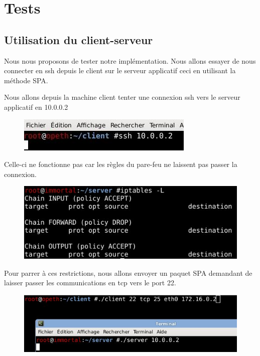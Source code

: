 \chapter{Tests}

\section{Utilisation du client-serveur}

Nous nous proposons de tester notre implémentation. Nous allons essayer de nous connecter en ssh depuis le client sur le serveur applicatif ceci en utilisant la méthode SPA.

Nous allons depuis la machine client tenter une connexion ssh vers le serveur applicatif en 10.0.0.2

\begin{figure}[h]

\centerline{\includegraphics[scale=0.75]{test_ssh.jpeg}}

\end{figure}

Celle-ci ne fonctionne pas car les règles du pare-feu ne laissent pas passer la connexion.

\begin{figure}[h]

\centerline{\includegraphics[scale=0.6]{regles_ip_avant}}

\end{figure}

Pour parrer à ces restrictions, nous allons envoyer un paquet SPA demandant de laisser passer les communications en tcp vers le port 22.

\begin{figure}[h]

\centerline{\includegraphics[scale=0.6]{execution_client.jpeg}}

\end{figure}


